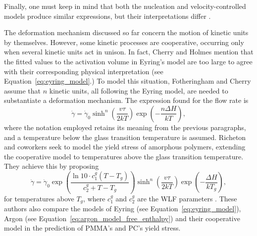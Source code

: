 Finally, one must keep in mind that both the nucleation and velocity-controlled models produce similar expressions, but their interpretations differ \citep{fotheringhamRoleRecoveryForces1978}.

The deformation mechanism discussed so far concern the motion of kinetic units by themselves.
However, some kinetic processes are cooperative, occurring only when several kinetic units act in unison.
In fact, Cherry and Holmes \citep{cherryYieldAdhesiveJoints1969} mention that the fitted values to the activation volume in Eyring's model are too large to agree with their corresponding physical interpretation (see Equation~\eqref{eq:eyring_model}.)
To model this situation, Fotheringham and Cherry \citep{fotheringhamCommentCompressionYield1976, fotheringhamRoleRecoveryForces1978} assume that $n$ kinetic units, all following the Eyring model, are needed to substantiate a deformation mechanism.
The expression found for the flow rate is
\begin{equation}
  \label{eq:cooperative_flow_rule}
	\dot{\gamma}=\dot \gamma_0 \sinh ^n\left(\frac{v \tau}{2 k T}\right) \exp \left(-\frac{n \Delta H}{k T}\right),
\end{equation}
where the notation employed retains its meaning from the previous paragraphs, and a temperature below the glass transition temperature is assumed.
Richeton and coworkers \citep{richetonFormulationCooperativeModel2005} seek to model the yield stress of amorphous polymers, extending the cooperative model to temperatures above the glass transition temperature.
They achieve this by proposing
\begin{equation}
		\dot{\gamma}=\dot \gamma_0 \exp\left(\frac{\ln 10\cdot c_1^g(T - T_g)}{c_2^g + T - T_g}\right) \sinh ^n\left(\frac{v \tau}{2 k T}\right) \exp \left(-\frac{\Delta H}{k T_g}\right),
\end{equation}
for temperatures above $T_g$, where $c_1^g$ and $c_2^g$ are the WLF parameters \citep{wardIntroductionMechanicalProperties2004}.
These authors \citep{richetonThermodynamicInvestigationYieldstress2007} also compare the models of Eyring (see Equation~\eqref{eq:eyring_model}), Argon (see Equation~\eqref{eq:argon_model_free_enthalpy}) and their cooperative model in the prediction of PMMA's and PC's yield stress.

